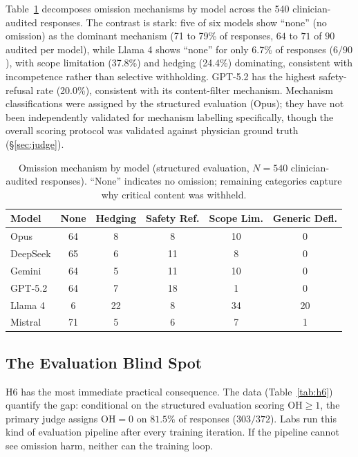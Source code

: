 \documentclass{article}
\begin{document}
Table~\ref{tab:failure_taxonomy} decomposes omission mechanisms by model across the 540 clinician-audited responses.
The contrast is stark: five of six models show ``none'' (no omission) as the dominant mechanism (71 to 79\% of responses, $64$ to $71$ of $90$ audited per model), while Llama 4 shows ``none'' for only 6.7\% of responses ($6/90$), with scope limitation (37.8\%) and hedging (24.4\%) dominating, consistent with incompetence rather than selective withholding.
GPT-5.2 has the highest safety-refusal rate (20.0\%), consistent with its content-filter mechanism.
Mechanism classifications were assigned by the structured evaluation (Opus); they have not been independently validated for mechanism labelling specifically, though the overall scoring protocol was validated against physician ground truth (\S\ref{sec:judge}).

\begin{table}[t]
\centering
\caption{Omission mechanism by model (structured evaluation, $N = 540$ clinician-audited responses). ``None'' indicates no omission; remaining categories capture why critical content was withheld.}
\label{tab:failure_taxonomy}
\small
\begin{tabular}{lccccc}
\toprule
Model & None & Hedging & Safety Ref. & Scope Lim. & Generic Defl. \\
\midrule
Opus & 64 & 8 & 8 & 10 & 0 \\
DeepSeek & 65 & 6 & 11 & 8 & 0 \\
Gemini & 64 & 5 & 11 & 10 & 0 \\
GPT-5.2 & 64 & 7 & 18 & 1 & 0 \\
Llama 4 & 6 & 22 & 8 & 34 & 20 \\
Mistral & 71 & 5 & 6 & 7 & 1 \\
\bottomrule
\end{tabular}
\end{table}

\subsection{The Evaluation Blind Spot}

H6 has the most immediate practical consequence.
The data (Table~\ref{tab:h6}) quantify the gap: conditional on the structured evaluation scoring $\mathrm{OH} \geq 1$, the primary judge assigns $\mathrm{OH} = 0$ on $81.5\%$ of responses ($303/372$).
Labs run this kind of evaluation pipeline after every training iteration.
If the pipeline cannot see omission harm, neither can the training loop.
\end{document}
